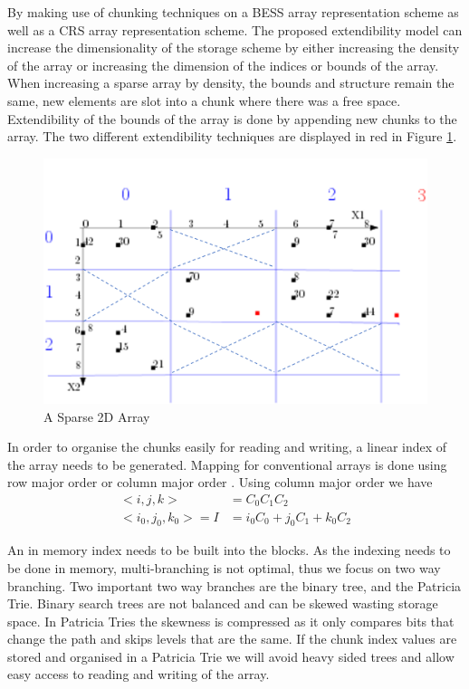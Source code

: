 By making use of chunking techniques on a BESS array representation scheme as well as a CRS array representation scheme. The proposed extendibility model can increase the dimensionality of the storage scheme by either increasing the density of the array or increasing the dimension of the indices or bounds of the array. When increasing a sparse array by density, the bounds and structure remain the same, new elements are slot into a chunk where there was a free space. Extendibility of the bounds of the array is done by appending new chunks to the array. The two different extendibility techniques are displayed in red in Figure \ref{fig:examplemethod}.
 
  \begin{figure}[H]
 	\centering
 	\includegraphics[width=0.7\linewidth]{methodExampleCrossed}
 	\caption{A Sparse 2D Array}
 	\label{fig:examplemethod}
 \end{figure}
 
 In order to organise the chunks easily for reading and writing, a linear index of the array needs to be generated. Mapping for conventional arrays is done using row major order or column major order \cite{otoo:2013:ced}. Using column major order we have 
 \begin{equation}
 	\begin{split}
 		<i,j,k> & = C_0 C_1 C_2 \\
 		<i_0,j_0,k_0> = I & = i_0C_0 + j_0C_1 + k_0C_2
 	\end{split}
 \end{equation} 
 
 An in memory index needs to be built into the blocks. As the indexing needs to be done in memory, multi-branching is not optimal, thus we focus on two way branching. Two important two way branches are the binary tree, and the Patricia Trie. Binary search trees are not balanced and can be skewed wasting storage space. In Patricia Tries the skewness is compressed as it only compares bits that change the path and skips levels that are the same. If the chunk index values are stored and organised in a Patricia Trie we will avoid heavy sided trees and allow easy access to reading and writing of the array.
 
